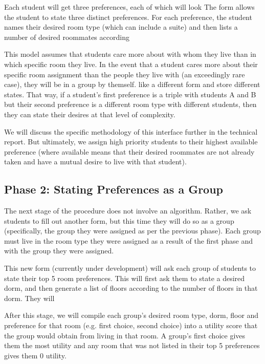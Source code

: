 \documentclass[12pt]{article}
\begin{document}
    Each student will get three preferences, each of which will look    The form allows the student to state three distinct preferences. For each preference, the student names their desired room type (which can include a suite) and then lists a number of desired roommates according 
    
    This model assumes that students care more about with whom they live than in which specific room they live. In the event that a student cares more about their specific room assignment than the people they live with (an exceedingly rare case), they will be in a group by themself. like a different form and store different states. That way, if a student's first preference is a triple with students A and B but their second preference is a different room type with different students, then they can state their desires at that level of complexity. 
    
    We will discuss the specific methodology of this interface further in the technical report. But ultimately, we assign high priority students to their highest available preference (where available means that their desired roommates are not already taken and have a mutual desire to live with that student). 
    
    \subsection*{Phase 2: Stating Preferences as a Group} 
    The next stage of the procedure does not involve an algorithm. Rather, we ask students to fill out another form, but this time they will do so as a group (specifically, the group they were assigned as per the previous phase). Each group must live in the room type they were assigned as a result of the first phase and with the group they were assigned. 
    
    This new form (currently under development) will ask each group of students to state their top 5 room preferences. This will first ask them to state a desired dorm, and then generate a list of floors according to the number of floors in that dorm. They will 
    
    After this stage, we will compile each group's desired room type, dorm, floor and preference for that room (e.g. first choice, second choice) into a utility score that the group would obtain from living in that room. A group's first choice gives them the most utility and any room that was not listed in their top 5 preferences gives them 0 utility. 
    
\end{document}
